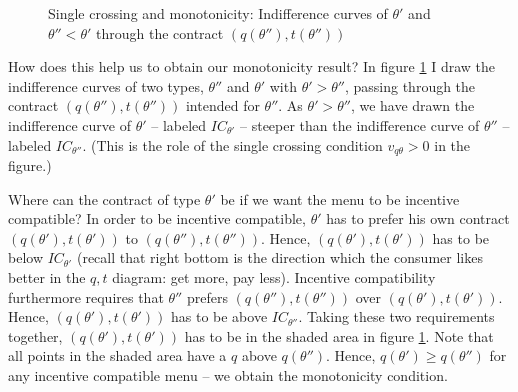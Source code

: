 \documentclass[12pt]{article}
\begin{document}
\begin{figure}[h]
  \centering
  \caption{Single crossing and monotonicity: Indifference curves of $\theta '$ and $\theta ''<\theta '$ through the contract $(q(\theta ''),t(\theta ''))$}
  \label{fig:mon}
\end{figure}

How does this help us to obtain our monotonicity result? In figure \ref{fig:mon} I draw the indifference curves of two types, $\theta ''$ and $\theta '$ with $\theta '>\theta ''$, passing through the contract $(q(\theta ''),t(\theta ''))$ intended for $\theta ''$. As $\theta '>\theta ''$, we have drawn the indifference curve of $\theta '$ -- labeled $IC_{\theta '}$ -- steeper than the indifference curve of $\theta ''$ -- labeled $IC_{\theta ''}$. (This is the role of the single crossing condition $v_{q\theta }>0$ in the figure.)

Where can the contract of type $\theta '$ be if we want the menu to be incentive compatible? In order to be incentive compatible, $\theta '$ has to prefer his own contract $(q(\theta '),t(\theta '))$ to $(q(\theta ''),t(\theta ''))$. Hence, $(q(\theta '),t(\theta '))$ has to be below $IC_{\theta '}$ (recall that right bottom is the direction which the consumer likes better in the $q,t$ diagram: get more, pay less). Incentive compatibility furthermore requires that $\theta ''$ prefers $(q(\theta ''),t(\theta ''))$ over $(q(\theta '),t(\theta '))$. Hence, $(q(\theta '),t(\theta '))$ has to be above $IC_{\theta ''}$. Taking these two requirements together, $(q(\theta '),t(\theta '))$ has to be in the shaded area in figure \ref{fig:mon}. Note that all points in the shaded area have a $q$ above $q(\theta '')$. Hence, $q(\theta ')\geq q(\theta '')$ for any incentive compatible menu -- we obtain the monotonicity condition.
\end{document}
